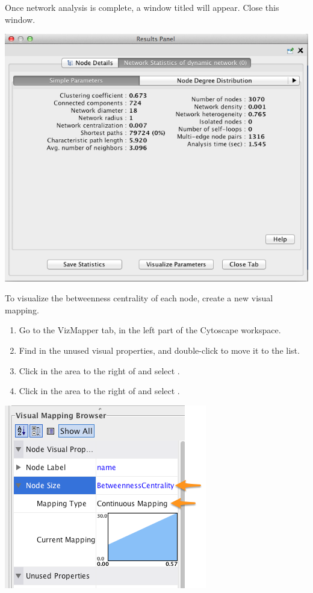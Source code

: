 \documentclass[letterpaper,10pt,english]{sphinxmanual}
\begin{document}
Once network analysis is complete, a window titled  will appear. Close
this window.

{\hfill\includegraphics{coauthors.11.png}\hfill}

To visualize the betweenness centrality of each node, create a new visual mapping.
\begin{enumerate}
\item {} 
Go to the VizMapper tab, in the left part of the Cytoscape workspace.

\item {} 
Find  in the unused visual properties, and double-click to move it to the
 list.

\item {} 
Click in the area to the right of  and select .

\item {} 
Click in the area to the right of  and select .

\end{enumerate}

{\hfill\includegraphics{coauthors.12.png}\hfill}
\end{document}
